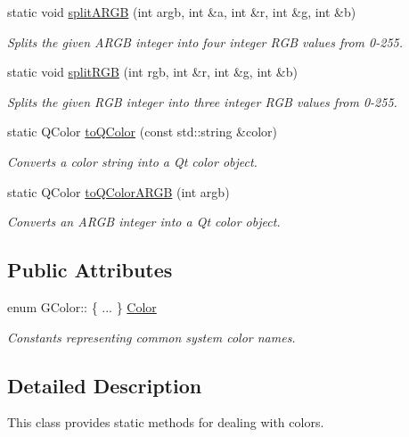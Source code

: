 \begin{DoxyCompactItemize}
static void \mbox{\hyperlink{classGColor_aa0ad89394f00240bdc0ec3b893eca6aa}{split\+A\+R\+GB}} (int argb, int \&a, int \&r, int \&g, int \&b)
\begin{DoxyCompactList}\small\item\em Splits the given A\+R\+GB integer into four integer R\+GB values from 0-\/255. \end{DoxyCompactList}\item 
static void \mbox{\hyperlink{classGColor_a32dea18e982a160b7b1ce8b4e881c0f9}{split\+R\+GB}} (int rgb, int \&r, int \&g, int \&b)
\begin{DoxyCompactList}\small\item\em Splits the given R\+GB integer into three integer R\+GB values from 0-\/255. \end{DoxyCompactList}\item 
static Q\+Color \mbox{\hyperlink{classGColor_a23f62da01b905b62266904a01cfb3745}{to\+Q\+Color}} (const std\+::string \&color)
\begin{DoxyCompactList}\small\item\em Converts a color string into a Qt color object. \end{DoxyCompactList}\item 
static Q\+Color \mbox{\hyperlink{classGColor_a979586dd4aaf299d42cf19619ee89280}{to\+Q\+Color\+A\+R\+GB}} (int argb)
\begin{DoxyCompactList}\small\item\em Converts an A\+R\+GB integer into a Qt color object. \end{DoxyCompactList}\end{DoxyCompactItemize}
\subsection*{Public Attributes}
\begin{DoxyCompactItemize}
\item 
enum G\+Color\+:: \{ ... \}  \mbox{\hyperlink{classGColor_a829e668b6af432af22e4fe68feff8c9a}{Color}}
\begin{DoxyCompactList}\small\item\em Constants representing common system color names. \end{DoxyCompactList}\end{DoxyCompactItemize}


\subsection{Detailed Description}
This class provides static methods for dealing with colors. 

